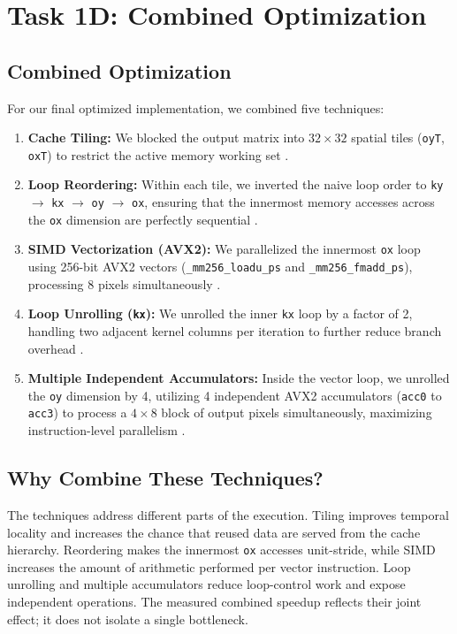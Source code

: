 
\section{Task 1D: Combined Optimization}

\subsection{Combined Optimization}
For our final optimized implementation, we combined five techniques:
\begin{enumerate}
    \item \textbf{Cache Tiling:} We blocked the output matrix into $32 \times 32$ spatial tiles (\texttt{oyT}, \texttt{oxT}) to restrict the active memory working set .
    \item \textbf{Loop Reordering:} Within each tile, we inverted the naive loop order to \texttt{ky} $\rightarrow$ \texttt{kx} $\rightarrow$ \texttt{oy} $\rightarrow$ \texttt{ox}, ensuring that the innermost memory accesses across the \texttt{ox} dimension are perfectly sequential .
    \item \textbf{SIMD Vectorization (AVX2):} We parallelized the innermost \texttt{ox} loop using 256-bit AVX2 vectors (\texttt{\_mm256\_loadu\_ps} and \texttt{\_mm256\_fmadd\_ps}), processing 8 pixels simultaneously .
    \item \textbf{Loop Unrolling (\texttt{kx}):} We unrolled the inner \texttt{kx} loop by a factor of 2, handling two adjacent kernel columns per iteration to further reduce branch overhead .
    \item \textbf{Multiple Independent Accumulators:} Inside the vector loop, we unrolled the \texttt{oy} dimension by 4, utilizing 4 independent AVX2 accumulators (\texttt{acc0} to \texttt{acc3}) to process a $4 \times 8$ block of output pixels simultaneously, maximizing instruction-level parallelism .
\end{enumerate}

\subsection{Why Combine These Techniques?}
The techniques address different parts of the execution. Tiling improves temporal locality and increases the chance that reused data are served from the cache hierarchy. Reordering makes the innermost \texttt{ox} accesses unit-stride, while SIMD increases the amount of arithmetic performed per vector instruction. Loop unrolling and multiple accumulators reduce loop-control work and expose independent operations. The measured combined speedup reflects their joint effect; it does not isolate a single bottleneck.

